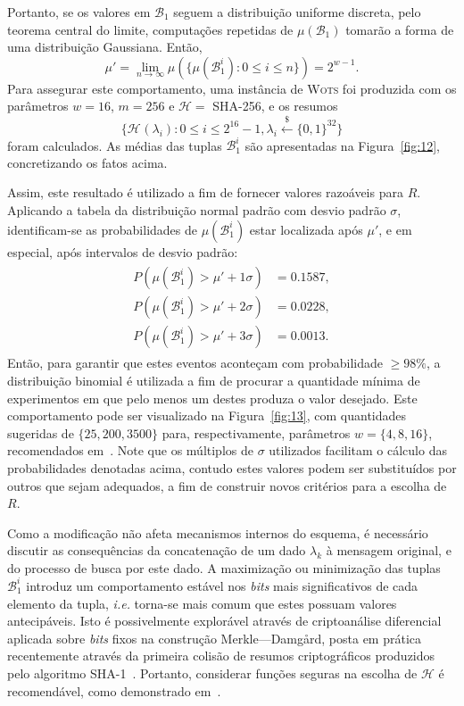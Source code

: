 \documentclass{ufsctex/ufsctex}
\newcommand{\hh}{\mathcal{H}}
\newcommand{\bone}{\mathcal{B}_{1}}
\newcommand{\hash}[2][]{\mathcal{H}^{#1} (#2)}
\newcommand{\binwds}[1]{\{0, 1\}^{#1}}
\newcommand{\random}{\stackrel{\$}{\longleftarrow}}
\newcommand{\wots}{\textsc{Wots}}
\begin{document}
Portanto, se os valores em $\bone{}$ seguem a distribuição uniforme discreta,
pelo teorema central do limite, computações repetidas de $\mu(\bone{})$ tomarão
a forma de uma distribuição Gaussiana. Então,
\begin{equation}
  \mu' = \lim_{n \to \infty}
    \mu(\{\mu(\bone^{i}) : 0 \leq i \leq n\}) = 2^{w - 1}.
\end{equation}
Para assegurar este comportamento, uma instância de \wots{} foi produzida com
os parâmetros $w = 16$, $m = 256$ e $\hh{} =$ SHA-256, e os resumos
\begin{equation}
  \{\hash{\lambda_{i}} : 0 \leq i \leq 2^{16} - 1, \lambda_{i}
    \random{} \binwds{32}\}
\end{equation}
foram calculados. As médias das tuplas $\bone^{i}$ são apresentadas na
Figura~\ref{fig:12}, concretizando os fatos acima.

Assim, este resultado é utilizado a fim de fornecer valores razoáveis para $R$.
Aplicando a tabela da distribuição normal padrão com desvio padrão $\sigma$,
identificam-se as probabilidades de $\mu(\bone^{i})$ estar localizada após
$\mu'$, e em especial, após intervalos de desvio padrão:
\begin{align}
  \begin{split}
    P(\mu(\bone^{i}) > \mu' + 1\sigma) &= 0.1587, \\
    P(\mu(\bone^{i}) > \mu' + 2\sigma) &= 0.0228, \\
    P(\mu(\bone^{i}) > \mu' + 3\sigma) &= 0.0013.
  \end{split}
\end{align}
Então, para garantir que estes eventos aconteçam com probabilidade $\geq 98\%$,
a distribuição binomial é utilizada a fim de procurar a quantidade mínima de
experimentos em que pelo menos um destes produza o valor desejado. Este
comportamento pode ser visualizado na Figura~\ref{fig:13}, com quantidades
sugeridas de $\{25, 200, 3500\}$ para, respectivamente, parâmetros $w = \{4, 8,
16\}$, recomendados em~\cite[Capítulo 6]{Huelsing:report:2018:may}. Note que
os múltiplos de $\sigma$ utilizados facilitam o cálculo das probabilidades
denotadas acima, contudo estes valores podem ser substituídos por outros
que sejam adequados, a fim de construir novos critérios para a escolha de $R$.

Como a modificação não afeta mecanismos internos do esquema, é necessário
discutir as consequências da concatenação de um dado $\lambda_{k}$ à mensagem
original, e do processo de busca por este dado. A maximização ou minimização
das tuplas $\bone^{i}$ introduz um comportamento estável nos \emph{bits} mais
significativos de cada elemento da tupla, \emph{i.e.} torna-se mais comum que
estes possuam valores antecipáveis. Isto é possivelmente explorável através de
criptoanálise diferencial aplicada sobre \emph{bits} fixos na construção
Merkle---Damgård, posta em prática recentemente através da primeira colisão de
resumos criptográficos produzidos pelo algoritmo
SHA-1~\cite{Stevens:inproc:2017:jul}. Portanto, considerar funções seguras na
escolha de $\hh{}$ é recomendável, como demonstrado em~\cite[Seção
3.2]{Huelsing:inproc:2013:jun}.
\end{document}
